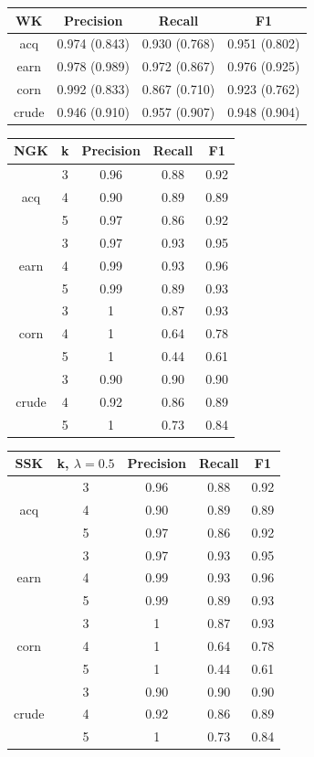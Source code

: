 
\begin{tabular}{ c | c | c | c | }
	 WK  & Precision & Recall & F1   \\ \hline	
	 acq &  0.974 (0.843) & 0.930 (0.768) & 0.951 (0.802) \\ \hline
	 earn &   0.978 (0.989)& 0.972 (0.867)& 0.976 (0.925)  \\ \hline
	 corn &   0.992 (0.833) & 0.867 (0.710) &  0.923 (0.762) \\ \hline
	 crude &   0.946 (0.910) & 0.957 (0.907) &  0.948 (0.904) \\ \hline
	
\end{tabular}

\begin{tabular}{ c | c | c | c | c | }
	NGK & k & Precision & Recall & F1   \\ \hline	
	 & 3 & 0.96 & 0.88 & 0.92     \\ 
	acq & 4 & 0.90 & 0.89 &  0.89    \\
	 & 5 & 0.97 & 0.86 & 0.92     \\ \hline
	 & 3 & 0.97 & 0.93 &  0.95    \\ 
	earn & 4 & 0.99 & 0.93 &  0.96    \\ 
	 & 5 & 0.99 & 0.89 &  0.93    \\ \hline
	 & 3 & 1 & 0.87 & 0.93     \\ 
	corn & 4 & 1 & 0.64 & 0.78     \\ 
	 & 5 & 1 & 0.44 &  0.61    \\ \hline
	 & 3 & 0.90 & 0.90 &  0.90    \\ 
	crude & 4 & 0.92 & 0.86 & 0.89     \\ 
	 & 5 & 1 & 0.73 &  0.84    \\ \hline
\end{tabular}

\begin{tabular}{ c | c | c | c | c | }
	SSK & k, $ \lambda = 0.5 $ & Precision & Recall & F1   \\ \hline	
	& 3 & 0.96 & 0.88 & 0.92     \\ 
	acq & 4 & 0.90 & 0.89 &  0.89    \\
	& 5 & 0.97 & 0.86 & 0.92     \\ \hline
	& 3 & 0.97 & 0.93 &  0.95    \\ 
	earn & 4 & 0.99 & 0.93 &  0.96    \\ 
	& 5 & 0.99 & 0.89 &  0.93    \\ \hline
	& 3 & 1 & 0.87 & 0.93     \\ 
	corn & 4 & 1 & 0.64 & 0.78     \\ 
	& 5 & 1 & 0.44 &  0.61    \\ \hline
	& 3 & 0.90 & 0.90 &  0.90    \\ 
	crude & 4 & 0.92 & 0.86 & 0.89     \\ 
	& 5 & 1 & 0.73 &  0.84    \\ \hline
\end{tabular}

